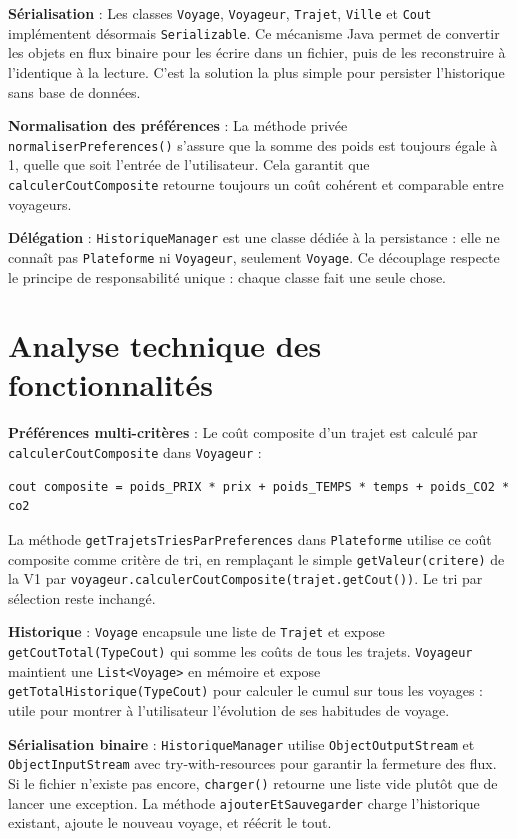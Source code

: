 \documentclass[fontsize=10pt,oneside,parskip=half]{scrreprt}
\newcommand{\ic}[1]{{\setlength{\fboxsep}{2pt}\colorbox{BeigeSerein}{\texttt{#1}}}}
\begin{document}
\noindent\textbf{Sérialisation} : Les classes \ic{Voyage}, \ic{Voyageur}, \ic{Trajet},
\ic{Ville} et \ic{Cout} implémentent désormais \ic{Serializable}. Ce mécanisme Java
permet de convertir les objets en flux binaire pour les écrire dans un fichier, puis de
les reconstruire à l'identique à la lecture. C'est la solution la plus simple pour
persister l'historique sans base de données.

\noindent\textbf{Normalisation des préférences} : La méthode privée
\ic{normaliserPreferences()} s'assure que la somme des poids est toujours égale à 1,
quelle que soit l'entrée de l'utilisateur. Cela garantit que \ic{calculerCoutComposite}
retourne toujours un coût cohérent et comparable entre voyageurs.

\noindent\textbf{Délégation} : \ic{HistoriqueManager} est une classe dédiée à la
persistance : elle ne connaît pas \ic{Plateforme} ni \ic{Voyageur}, seulement
\ic{Voyage}. Ce découplage respecte le principe de responsabilité unique : chaque classe
fait une seule chose.

\section{Analyse technique des fonctionnalités}

\noindent\textbf{Préférences multi-critères} : Le coût composite d'un trajet est calculé
par \ic{calculerCoutComposite} dans \ic{Voyageur} :

\begin{lstlisting}[style=bash]
cout composite = poids_PRIX * prix + poids_TEMPS * temps + poids_CO2 * co2
\end{lstlisting}

La méthode \ic{getTrajetsTriesParPreferences} dans \ic{Plateforme} utilise ce coût
composite comme critère de tri, en remplaçant le simple \ic{getValeur(critere)} de la
V1 par \ic{voyageur.calculerCoutComposite(trajet.getCout())}. Le tri par sélection
reste inchangé.

\noindent\textbf{Historique} : \ic{Voyage} encapsule une liste de \ic{Trajet} et expose
\ic{getCoutTotal(TypeCout)} qui somme les coûts de tous les trajets. \ic{Voyageur}
maintient une \ic{List<Voyage>} en mémoire et expose \ic{getTotalHistorique(TypeCout)}
pour calculer le cumul sur tous les voyages : utile pour montrer à l'utilisateur
l'évolution de ses habitudes de voyage.

\noindent\textbf{Sérialisation binaire} : \ic{HistoriqueManager} utilise
\ic{ObjectOutputStream} et \ic{ObjectInputStream} avec try-with-resources pour
garantir la fermeture des flux. Si le fichier n'existe pas encore, \ic{charger()}
retourne une liste vide plutôt que de lancer une exception. La méthode
\ic{ajouterEtSauvegarder} charge l'historique existant, ajoute le nouveau voyage,
et réécrit le tout.
\end{document}
